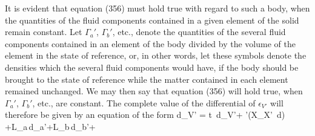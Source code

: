 \documentclass[12pt]{article}
\begin{document}
{It is evident that equation (356) must hold true with regard to such a body, when the quantities of the fluid components contained in a given element of the solid remain constant. Let $\Gamma_a'$, $\Gamma_b'$, etc., denote the quantities of the several fluid components contained in an element of the body divided by the volume of the element in the state of reference, or, in other words, let these symbols denote the densities which the several fluid components would have, if the body should be brought to the state of reference while the matter contained in each element remained unchanged. We may then say that equation (356) will hold true, when $\Gamma_a'$, $\Gamma_b'$, etc., are constant. The complete value of the differential of $\epsilon_{V'}$ will therefore be given by an equation of the form
\eqs d\epsilon_{V'} = t \,d\eta_{V'}+  \sum\sum\nolimits'\left(X_{X'} \,d\right) +L_a\,d\Gamma_a'+L_b\,d\Gamma_b'+     \label{462}\eqe


}
\end{document}
